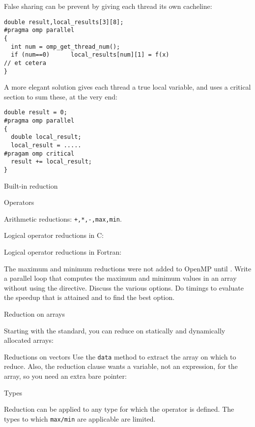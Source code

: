 False sharing can be prevent by giving each thread its own cacheline:
\begin{lstlisting}
double result,local_results[3][8];
#pragma omp parallel
{
  int num = omp_get_thread_num();
  if (num==0)      local_results[num][1] = f(x)
// et cetera
}
\end{lstlisting}
A more elegant solution gives each thread a true local variable,
and uses a critical section to sum these, at the very end:
\begin{lstlisting}
double result = 0;
#pragma omp parallel
{
  double local_result;
  local_result = .....
#pragam omp critical
  result += local_result;
}
\end{lstlisting}

 {Built-in reduction}

 {Operators}

Arithmetic reductions: \lstinline{+,*,-,max,min}.

Logical operator reductions in C: \n{& && | || ^}

Logical operator reductions in Fortran:

\begin{exercise}
  The maximum and minimum reductions were not added to OpenMP until
  .
  Write a parallel loop that computes the maximum and
  minimum values in an array without using the  directive.
  Discuss the various options. Do timings
  to evaluate the speedup that is attained and to find the best option.
\end{exercise}

 {Reduction on arrays}
\label{sec:omp-array-reduct}

Starting with the  standard, you can reduce
on statically and dynamically allocated arrays:

\begin{cppnote}{Reductions on vectors}
  Use the \lstinline{data} method to extract the array
  on which to reduce.
  Also, the reduction clause wants a variable, not an expression,
  for the array, so you need an extra bare pointer:
\end{cppnote}

 {Types}

Reduction can be applied to any type for which the operator is defined.
The types to which \lstinline{max/min} are applicable are limited.

